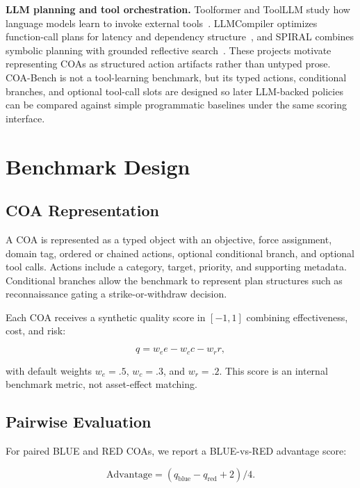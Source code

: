 \documentclass[sigconf]{acmart}
\begin{document}
\textbf{LLM planning and tool orchestration.} Toolformer and ToolLLM study how language models learn to invoke external tools~\cite{schick2023toolformer,qin2024toolllm}. LLMCompiler optimizes function-call plans for latency and dependency structure~\cite{kim2024llmcompiler}, and SPIRAL combines symbolic planning with grounded reflective search~\cite{zhang2026spiral}. These projects motivate representing COAs as structured action artifacts rather than untyped prose. COA-Bench is not a tool-learning benchmark, but its typed actions, conditional branches, and optional tool-call slots are designed so later LLM-backed policies can be compared against simple programmatic baselines under the same scoring interface.

\section{Benchmark Design}

\subsection{COA Representation}

A COA is represented as a typed object with an objective, force assignment, domain tag, ordered or chained actions, optional conditional branch, and optional tool calls. Actions include a category, target, priority, and supporting metadata. Conditional branches allow the benchmark to represent plan structures such as reconnaissance gating a strike-or-withdraw decision.

Each COA receives a synthetic quality score in $[-1,1]$ combining effectiveness, cost, and risk:

\begin{equation}
q = w_e e - w_c c - w_r r,
\end{equation}

with default weights $w_e=.5$, $w_c=.3$, and $w_r=.2$. This score is an internal benchmark metric, not asset-effect matching.

\subsection{Pairwise Evaluation}

For paired BLUE and RED COAs, we report a BLUE-vs-RED advantage score:

\begin{equation}
\mathrm{Advantage} = (q_{\mathrm{blue}} - q_{\mathrm{red}} + 2) / 4.
\end{equation}
\end{document}
